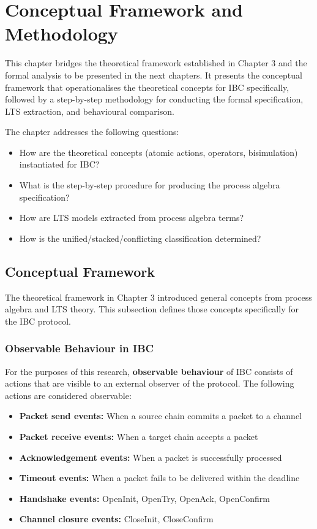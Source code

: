 \chapter{Conceptual Framework and
Methodology}\label{conceptual-framework-and-methodology}

This chapter bridges the theoretical framework established in Chapter 3
and the formal analysis to be presented in the next chapters. It
presents the conceptual framework that operationalises the theoretical
concepts for IBC specifically, followed by a step-by-step methodology
for conducting the formal specification, LTS extraction, and behavioural
comparison.

The chapter addresses the following questions:

\begin{itemize}
    \item How are the theoretical concepts (atomic actions, operators, bisimulation) instantiated for IBC?
    \item What is the step-by-step procedure for producing the process algebra specification?
    \item How are LTS models extracted from process algebra terms?
    \item How is the unified/stacked/conflicting classification determined?
\end{itemize}

\section{Conceptual Framework}\label{conceptual-framework}

The theoretical framework in Chapter 3 introduced general concepts from
process algebra and LTS theory. This subsection defines those concepts
specifically for the IBC protocol.

\subsection{Observable Behaviour in
IBC}\label{observable-behaviour-in-ibc}

For the purposes of this research, \textbf{observable behaviour} of IBC
consists of actions that are visible to an external observer of the
protocol. The following actions are considered observable:

\begin{itemize}
    \item \textbf{Packet send events:} When a source chain commits a packet to a channel
    \item \textbf{Packet receive events:} When a target chain accepts a packet
    \item \textbf{Acknowledgement events:} When a packet is successfully processed
    \item \textbf{Timeout events:} When a packet fails to be delivered within the deadline
    \item \textbf{Handshake events:} OpenInit, OpenTry, OpenAck, OpenConfirm
    \item \textbf{Channel closure events:} CloseInit, CloseConfirm
\end{itemize}

